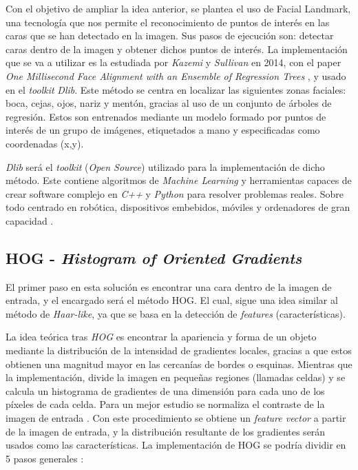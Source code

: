 Con el objetivo de ampliar la idea anterior, se plantea el uso de Facial Landmark, una tecnología que nos permite el reconocimiento de puntos de interés en las caras que se han detectado en la imagen. Sus pasos de ejecución son: detectar caras dentro de la imagen y obtener dichos puntos de interés. La implementación que se va a utilizar es la estudiada por \textit{Kazemi} y \textit{Sullivan} en 2014, con el paper \textit{One Millisecond Face Alignment with an Ensemble of Regression Trees} \cite{inproceedings}, y usado en el \textit{toolkit} \textit{Dlib}. Este método se centra en localizar las siguientes zonas faciales: boca, cejas, ojos, nariz y mentón, gracias al uso de un conjunto de árboles de regresión. Estos son entrenados mediante  un modelo formado por puntos de interés de un grupo de imágenes, etiquetados a mano y especificadas como coordenadas (x,y). 

\textit{Dlib} será el \textit{toolkit} (\textit{Open Source}) utilizado para la implementación de dicho método. Este contiene algoritmos de \textit{Machine Learning} y herramientas capaces de crear software complejo en \textit{C++} y \textit{Python} para resolver problemas reales. Sobre todo centrado en robótica, dispositivos embebidos, móviles y ordenadores de gran capacidad \cite{dlib}. 

\subsection*{HOG - \textit{Histogram of Oriented Gradients}}

El primer paso en esta solución es encontrar una cara dentro de la imagen de entrada, y el encargado será el método HOG. El cual, sigue una idea similar al método de \textit{Haar-like}, ya que se basa en la detección de \textit{features} (características).

La idea teórica tras \textit{HOG} es encontrar la apariencia y forma de un objeto mediante la distribución de la intensidad de gradientes locales, gracias a que estos obtienen una magnitud mayor en las cercanías de bordes o esquinas. Mientras que la implementación, divide la imagen en pequeñas regiones (llamadas celdas) y se calcula un histograma de gradientes de una dimensión para cada uno de los píxeles de cada celda. Para un mejor estudio se normaliza el contraste de la imagen de entrada \cite{hog}. Con este procedimiento se obtiene un \textit{feature vector} a partir de la imagen de entrada, y la distribución resultante de los gradientes serán usados como las características. La implementación de HOG se podría dividir en 5 pasos generales \cite{hog2}:

